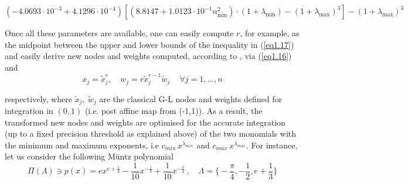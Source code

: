 \documentclass[a4paper, twosided]{book}
\begin{document}
\begin{equation}\label{eq1.18}
    (-4.0693\cdot10^{-3}+4.1296\cdot10^{-4})[(8.8147+1.0123\cdot10^{-1}n_{\text{min}}^2)\cdot(1+\lambda_{\text{min}})-(1+\lambda_{\text{max}})^3] - (1+\lambda_{\text{max}})^3
\end{equation}

\noindent
Once all these parameters are available, one can easily compute $r$, for example, as the midpoint between the upper and lower bounds of the inequality in (\ref{eq1.17}) and easily derive new nodes and weights computed, according to \cite{Lombardi09,Lombardi21}, via (\ref{eq1.16}) and 
\begin{equation}\label{eq1.19}
    x_j=\tilde{x}_j^{r},\quad w_j = r\tilde{x}_j^{r-1}\tilde{w}_j\,\quad\forall j=1,...,n
\end{equation}

\noindent
respectively, where $\tilde{x}_j,\:\tilde{w}_j$ are the classical G-L nodes and weights defined for integration in $(0,1)$ (i.e. post affine map from (-1,1)). As a result, the transformed new nodes and weights are optimised for the accurate integration (up to a fixed precision threshold as explained above) of the two monomials with the minimum and maximum exponents, i.e $c_{min}\,x^{\lambda_{min}}$ and $c_{max}\,x^{\lambda_{max}}$. For instance, let us consider the following  Müntz polynomial
\begin{equation}\label{eq1.20}
    \Pi(\Lambda)\ni p(x) = ex^{e+\frac{1}{4}} -\frac{1}{10}x^{-\frac{1}{2}} + \frac{1}{10}x^{-\frac{\pi}{4}}\,,\quad\Lambda=\Big\{-\frac{\pi}{4},-\frac{1}{2},e+\frac{1}{3}\Big\}
\end{equation}
\end{document}
